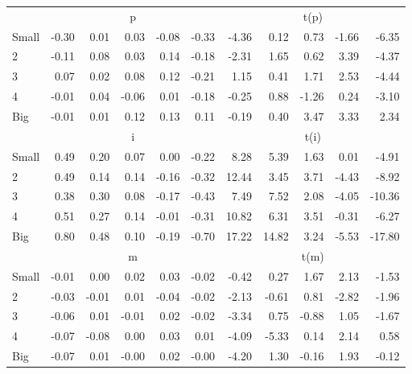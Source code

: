 \begin{table}[!ht]
\begin{tabular}{lrrrrrrrrrr}
      & \multicolumn{5}{c}{p} & \multicolumn{5}{c}{t(p)}
    
    \\
      \cmidrule(r){2-6} \cmidrule(r){7-11}

    Small   & -0.30  & 0.01  & 0.03  & -0.08  & -0.33  & -4.36  & 0.12  & 0.73  & -1.66  & -6.35  \\
         2  & -0.11  & 0.08  & 0.03  & 0.14  & -0.18  & -2.31  & 1.65  & 0.62  & 3.39  & -4.37  \\
         3  & 0.07  & 0.02  & 0.08  & 0.12  & -0.21  & 1.15  & 0.41  & 1.71  & 2.53  & -4.44  \\
         4  & -0.01  & 0.04  & -0.06  & 0.01  & -0.18  & -0.25  & 0.88  & -1.26  & 0.24  & -3.10  \\
    Big     & -0.01  & 0.01  & 0.12  & 0.13  & 0.11  & -0.19  & 0.40  & 3.47  & 3.33  & 2.34  \\

  
    
      & \multicolumn{5}{c}{i} & \multicolumn{5}{c}{t(i)}
    
    \\
      \cmidrule(r){2-6} \cmidrule(r){7-11}

    Small   & 0.49  & 0.20  & 0.07  & 0.00  & -0.22  & 8.28  & 5.39  & 1.63  & 0.01  & -4.91  \\
         2  & 0.49  & 0.14  & 0.14  & -0.16  & -0.32  & 12.44  & 3.45  & 3.71  & -4.43  & -8.92  \\
         3  & 0.38  & 0.30  & 0.08  & -0.17  & -0.43  & 7.49  & 7.52  & 2.08  & -4.05  & -10.36  \\
         4  & 0.51  & 0.27  & 0.14  & -0.01  & -0.31  & 10.82  & 6.31  & 3.51  & -0.31  & -6.27  \\
    Big     & 0.80  & 0.48  & 0.10  & -0.19  & -0.70  & 17.22  & 14.82  & 3.24  & -5.53  & -17.80  \\

  
    
      & \multicolumn{5}{c}{m} & \multicolumn{5}{c}{t(m)}
    
    \\
      \cmidrule(r){2-6} \cmidrule(r){7-11}

    Small   & -0.01  & 0.00  & 0.02  & 0.03  & -0.02  & -0.42  & 0.27  & 1.67  & 2.13  & -1.53  \\
         2  & -0.03  & -0.01  & 0.01  & -0.04  & -0.02  & -2.13  & -0.61  & 0.81  & -2.82  & -1.96  \\
         3  & -0.06  & 0.01  & -0.01  & 0.02  & -0.02  & -3.34  & 0.75  & -0.88  & 1.05  & -1.67  \\
         4  & -0.07  & -0.08  & 0.00  & 0.03  & 0.01  & -4.09  & -5.33  & 0.14  & 2.14  & 0.58  \\
    Big     & -0.07  & 0.01  & -0.00  & 0.02  & -0.00  & -4.20  & 1.30  & -0.16  & 1.93  & -0.12  \\

  

  \bottomrule
\end{tabular}
\label{tbl:25_Size_Inv_F17}
\end{table}